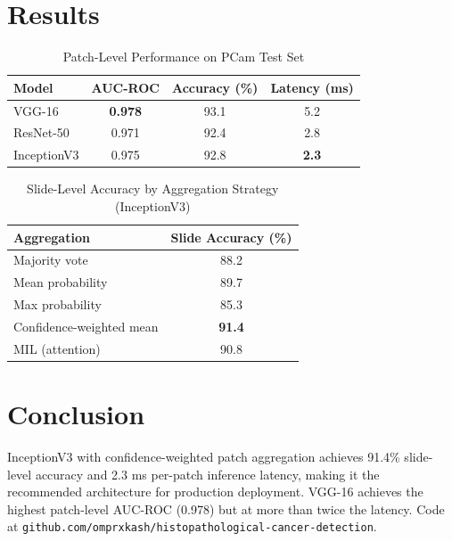 \documentclass[conference]{IEEEtran}
\begin{document}
\section{Results}

\begin{table}[htbp]
\caption{Patch-Level Performance on PCam Test Set}
\begin{center}
\begin{tabular}{|l|c|c|c|}
\hline
\textbf{Model} & \textbf{AUC-ROC} & \textbf{Accuracy (\%)} & \textbf{Latency (ms)} \\
\hline
VGG-16 & \textbf{0.978} & 93.1 & 5.2 \\
ResNet-50 & 0.971 & 92.4 & 2.8 \\
InceptionV3 & 0.975 & 92.8 & \textbf{2.3} \\
\hline
\end{tabular}
\label{tab:patch}
\end{center}
\end{table}

\begin{table}[htbp]
\caption{Slide-Level Accuracy by Aggregation Strategy (InceptionV3)}
\begin{center}
\begin{tabular}{|l|c|}
\hline
\textbf{Aggregation} & \textbf{Slide Accuracy (\%)} \\
\hline
Majority vote & 88.2 \\
Mean probability & 89.7 \\
Max probability & 85.3 \\
Confidence-weighted mean & \textbf{91.4} \\
MIL (attention) & 90.8 \\
\hline
\end{tabular}
\label{tab:slide}
\end{center}
\end{table}

\section{Conclusion}

InceptionV3 with confidence-weighted patch aggregation achieves 91.4\% slide-level accuracy and 2.3 ms per-patch inference latency, making it the recommended architecture for production deployment. VGG-16 achieves the highest patch-level AUC-ROC (0.978) but at more than twice the latency. Code at \texttt{github.com/omprxkash/histopathological-cancer-detection}.
\end{document}
